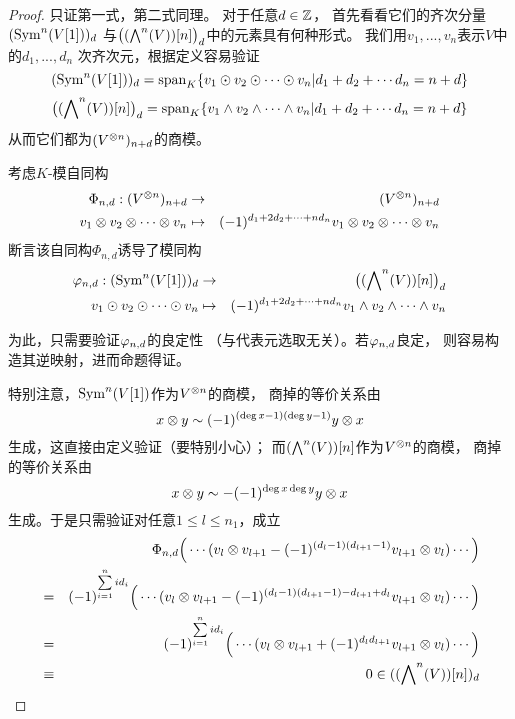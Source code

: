 \begin{proof}
只证第一式，第二式同理。
对于任意$d\in\mathbb{Z}$，
首先看看它们的齐次分量$(\operatorname{Sym}^n(V[1]))_d$
与$\big((\bigwedge\nolimits^{n}(V))[n]\big)_d$中的元素具有何种形式。
我们用$v_1,...,v_n$表示$V$中的$d_1,...,d_n$
次齐次元，根据定义容易验证
$$(\operatorname{Sym}^n(V[1]))_d=
\operatorname{span}_K \{v_1\odot v_2\odot\cdots\odot v_n|
d_1+d_2+\cdots d_n=n+d\}$$
$$\big((\bigwedge\nolimits^{n}(V))[n]\big)_d=
\operatorname{span}_K \{v_1\wedge v_2\wedge\cdots\wedge v_n|
d_1+d_2+\cdots d_n=n+d\}$$
从而它们都为$(V^{\otimes n})_{n+d}$的商模。

考虑$K$-模自同构
\begin{eqnarray*}
\Phi_{n,d}:(V^{\otimes n})_{n+d}&\to&(V^{\otimes n})_{n+d}\\
v_1\otimes v_2\otimes\cdots\otimes v_n
&\mapsto&(-1)^{d_1+2d_2+\cdots+nd_n}
v_1\otimes v_2\otimes\cdots\otimes v_n
\end{eqnarray*}
断言该自同构$\Phi_{n,d}$诱导了模同构
\begin{eqnarray*}
\varphi_{n,d}:(\operatorname{Sym}^n(V[1]))_d&\to&
\big((\bigwedge\nolimits^{n}(V))[n]\big)_d\\
v_1\odot v_2\odot\cdots\odot v_n
&\mapsto&(-1)^{d_1+2d_2+\cdots+nd_n}
v_1\wedge v_2\wedge\cdots\wedge v_n
\end{eqnarray*}

为此，只需要验证$\varphi_{n,d}$的良定性
（与代表元选取无关）。若$\varphi_{n,d}$良定，
则容易构造其逆映射，进而命题得证。

特别注意，$\operatorname{Sym}^n(V[1])$作为$V^{\otimes n}$的商模，
商掉的等价关系由
$$x\otimes y\sim(-1)^{(\deg x-1)(\deg y-1)}y\otimes x$$
生成，这直接由定义验证（{\color{red}要特别小心}）；
而$(\bigwedge\nolimits^{n}(V))[n]$作为$V^{\otimes n}$的商模，
商掉的等价关系由
$$x\otimes y\sim-(-1)^{\deg x\deg y}y\otimes x$$
生成。于是只需验证对任意$1\leq l\leq n_1$，成立
\begin{eqnarray*}
&&
    \Phi_{n,d}\Big(
                 \cdots( v_{l}\otimes v_{l+1}
                   -(-1)^{(d_l-1)(d_{l+1}-1)}v_{l+1}\otimes v_{l}
                 )\cdots
              \Big)\\
&=&
    (-1)^{\sum\limits_{i=1}^nid_i}
    \Big(
      \cdots(
        v_l\otimes v_{l+1}-(-1)^{(d_l-1)(d_{l+1}-1)-d_{l+1}+d_l}
        v_{l+1}\otimes v_{l}
      )\cdots
    \Big)\\
&=&
    (-1)^{\sum\limits_{i=1}^nid_i}
    \Big(
      \cdots(
        v_l\otimes v_{l+1}+(-1)^{d_ld_{l+1}}
        v_{l+1}\otimes v_{l}
      )\cdots
    \Big)\\
&\equiv& 0\in ((\bigwedge\nolimits^{n}(V))[n])_d
\end{eqnarray*}


\end{proof}


